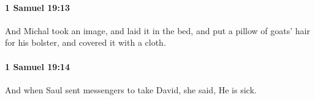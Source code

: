 		\paragraph{1 Samuel 19:13} %
			\label{1SAMUEL-19-13}

			And Michal took an image, and laid it in the bed, and put a pillow of goats’ hair for his bolster, and covered it with a cloth.


		\paragraph{1 Samuel 19:14} %
			\label{1SAMUEL-19-14}

			And when Saul sent messengers to take David, she said, He is sick.


